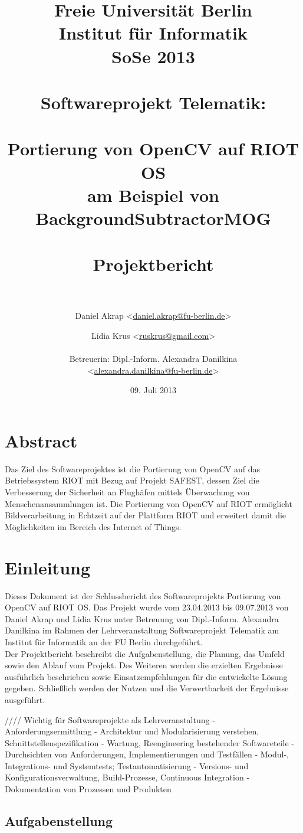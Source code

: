 \documentclass[10pt,a4paper]{article}
\title{Freie Universität Berlin \\
	Institut für Informatik \\
	SoSe 2013 \\ \ \\
	Softwareprojekt Telematik: \\ \ \\
	\textbf {Portierung von OpenCV auf RIOT OS} \\
	\textbf {am Beispiel von BackgroundSubtractorMOG} \\ \ \\
	Projektbericht \\ \ \\}
\author{Daniel Akrap  \textless\href{mailto:daniel.akrap@fu-berlin.de}{daniel.akrap@fu-berlin.de}\textgreater
        \and Lidia Krus \textless\href{mailto:ruskrus@gmail.com}{ruskrus@gmail.com}\textgreater 		\\ \\
	Betreuerin: Dipl.-Inform. Alexandra Danilkina \\ 
	\textless\href{mailto:alexandra.danilkina@fu-berlin.de}{alexandra.danilkina@fu-berlin.de}\textgreater}
\date{09. Juli 2013}
\begin{document}
\maketitle

\newpage
\section*{Abstract}

Das Ziel des Softwareprojektes ist die Portierung von OpenCV auf das Betriebssystem RIOT mit Bezug auf Projekt SAFEST, dessen Ziel die Verbesserung der Sicherheit an Flughäfen mittels Überwachung von Menschenansammlungen ist. Die Portierung von OpenCV auf RIOT ermöglicht Bildverarbeitung in Echtzeit auf der Plattform RIOT und erweitert damit die Möglichkeiten im Bereich des Internet of Things. \\

\newpage
\tableofcontents
\setcounter{tocdepth}{3}

\newpage
\section{Einleitung}

Dieses Dokument ist der Schlussbericht des Softwareprojekts \glqq Portierung von OpenCV auf RIOT OS\grqq. Das Projekt wurde vom 23.04.2013 bis 09.07.2013 von Daniel Akrap und Lidia Krus unter Betreuung von Dipl.-Inform. Alexandra Danilkina im Rahmen der Lehrveranstaltung Softwareprojekt Telematik am Institut für Informatik an der FU Berlin durchgeführt. \\

Der Projektbericht beschreibt die Aufgabenstellung, die Planung, das Umfeld sowie den Ablauf vom Projekt. Des Weiteren werden die erzielten Ergebnisse ausführlich beschrieben sowie Einsatzempfehlungen für die entwickelte Lösung gegeben. Schließlich werden der Nutzen und die Verwertbarkeit der Ergebnisse ausgeführt.

//// Wichtig für Softwareprojekte als Lehrveranstaltung
- Anforderungsermittlung 
- Architektur und Modularisierung verstehen, Schnittstellenspezifikation
- Wartung, Reengineering bestehender Softwareteile
- Durchsichten von Anforderungen, Implementierungen und Testfällen
- Modul-, Integrations- und Systemtests; Testautomatisierung
- Versions- und Konfigurationsverwaltung, Build-Prozesse, Continuous Integration
- Dokumentation von Prozessen und Produkten


\subsection{Aufgabenstellung}
\end{document}

